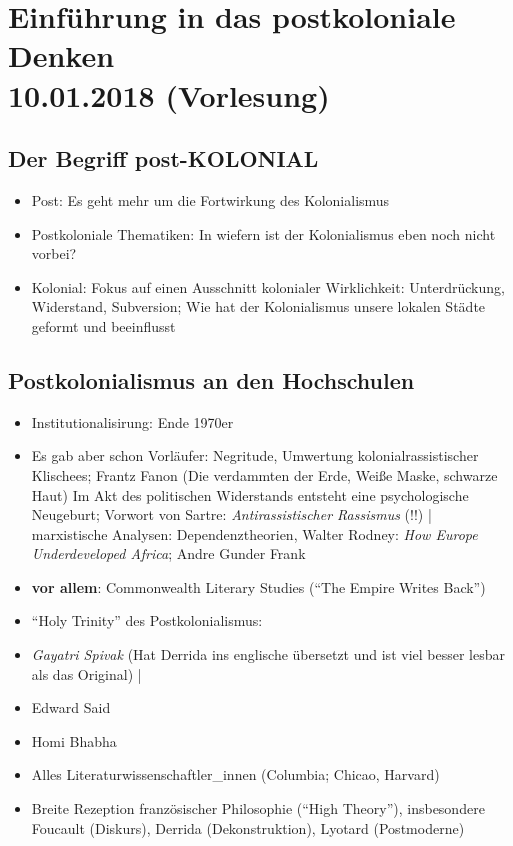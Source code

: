 \documentclass[emulatestandardclasses]{scrartcl}
\begin{document}
\section{Einführung in das postkoloniale Denken\\10.01.2018 (Vorlesung)}

\subsection{Der Begriff post-KOLONIAL}

\begin{itemize}
  \item Post: Es geht mehr um die Fortwirkung des Kolonialismus
  \item Postkoloniale Thematiken: In wiefern ist der Kolonialismus eben noch nicht vorbei?
  \item Kolonial: Fokus auf einen Ausschnitt kolonialer Wirklichkeit: Unterdrückung, Widerstand, Subversion; Wie hat der Kolonialismus unsere lokalen Städte geformt und beeinflusst
\end{itemize}

\subsection{Postkolonialismus an den Hochschulen}

\begin{itemize}
  \item Institutionalisirung: Ende 1970er
  \item Es gab aber schon Vorläufer: Negritude, Umwertung kolonialrassistischer Klischees; Frantz Fanon (Die verdammten der Erde, Weiße Maske, schwarze Haut) Im Akt des politischen Widerstands entsteht eine psychologische Neugeburt; Vorwort von Sartre: \emph{Antirassistischer Rassismus} (!!) | marxistische Analysen: Dependenztheorien, Walter Rodney: \emph{How Europe Underdeveloped Africa}; Andre Gunder Frank 
  \item \textbf{vor allem}: Commonwealth Literary Studies ("`The Empire Writes Back"')
  \item "`Holy Trinity"' des Postkolonialismus:
  \item \emph{Gayatri Spivak} (Hat Derrida ins englische übersetzt und ist viel besser lesbar als das Original) | 
  \item Edward Said
  \item Homi Bhabha
  \item Alles Literaturwissenschaftler_innen (Columbia; Chicao, Harvard)
  \item Breite Rezeption französischer Philosophie ("`High Theory"'), insbesondere Foucault (Diskurs), Derrida (Dekonstruktion), Lyotard (Postmoderne)
\end{itemize}
\end{document}
